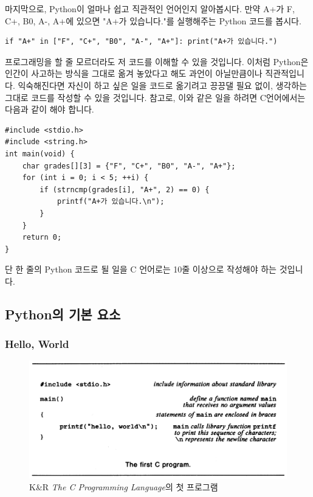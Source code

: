 \documentclass[../main.tex]{subfiles}
\begin{document}
마지막으로, Python이 얼마나 쉽고 직관적인 언어인지 알아봅시다.
만약 A+가 F, C+, B0, A-, A+에 있으면 "A+가 있습니다."를 실행해주는 Python 코드를 봅시다.
\begin{verbatim}
if "A+" in ["F", "C+", "B0", "A-", "A+"]: print("A+가 있습니다.")
\end{verbatim}
프로그래밍을 할 줄 모르더라도 저 코드를 이해할 수 있을 것입니다.
이처럼 Python은 인간이 사고하는 방식을 그대로 옮겨 놓았다고 해도 과언이 아닐만큼이나 직관적입니다.
익숙해진다면 자신이 하고 싶은 일을 코드로 옮기려고 끙끙댈 필요 없이, 생각하는 그대로 코드를 작성할 수 있을 것입니다.
참고로, 이와 같은 일을 하려면 C언어에서는 다음과 같이 해야 합니다.
\begin{verbatim}
#include <stdio.h>
#include <string.h>
int main(void) {
    char grades[][3] = {"F", "C+", "B0", "A-", "A+"};
    for (int i = 0; i < 5; ++i) {
        if (strncmp(grades[i], "A+", 2) == 0) {
            printf("A+가 있습니다.\n");
        }
    }
    return 0;
}
\end{verbatim}
단 한 줄의 Python 코드로 될 일을 C 언어로는 10줄 이상으로 작성해야 하는 것입니다.

\subsection{Python의 기본 요소}
\subsubsection{Hello, World}

\begin{figure}[htpb]
    \centering
    \includegraphics[width=0.8\linewidth]{./figures/hello_world.png}
    \caption*{K\&R \textit{The C Programming Language}의 첫 프로그램}
\end{figure}
\end{document}
